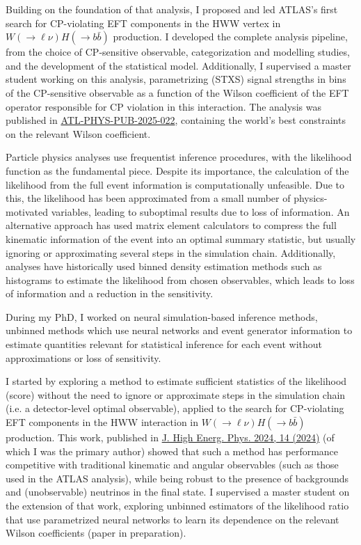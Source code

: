 \documentclass[11pt, a4paper]{awesome-cv}
\begin{document}
\begin{cvletter}
  Building on the foundation of that analysis, I proposed and led ATLAS's first search for CP-violating EFT components in the HWW vertex in $W(\to \ell \nu)H(\to b\bar{b})$ production. I developed the complete analysis pipeline, from the choice of CP-sensitive observable, categorization and modelling studies, and the development of the statistical model. Additionally, I supervised a master student working on this analysis, parametrizing (STXS) signal strengths in bins of the CP-sensitive observable as a function of the Wilson coefficient of the EFT operator responsible for CP violation in this interaction. The analysis was published in \href{https://atlas.web.cern.ch/Atlas/GROUPS/PHYSICS/PUBNOTES/ATL-PHYS-PUB-2025-022/}{ATL-PHYS-PUB-2025-022}, containing the world's best constraints on the relevant Wilson coefficient.
  
  
  Particle physics analyses use frequentist inference procedures, with the likelihood function as the fundamental piece. Despite its importance, the calculation of the likelihood from the full event information is computationally unfeasible. Due to this, the likelihood has been approximated from a small number of physics-motivated variables, leading to suboptimal results due to loss of information. An alternative approach has used matrix element calculators to compress the full kinematic information of the event into an optimal summary statistic, but usually ignoring or approximating several steps in the simulation chain. Additionally, analyses have historically used binned density estimation methods such as histograms to estimate the likelihood from chosen observables, which leads to loss of information and a reduction in the sensitivity.

  During my PhD, I worked on neural simulation-based inference methods, unbinned methods which use neural networks and event generator information to estimate quantities relevant for statistical inference for each event without approximations or loss of sensitivity.
  
  I started by exploring a method to estimate sufficient statistics of the likelihood (score) without the need to ignore or approximate steps in the simulation chain (i.e. a detector-level optimal observable), applied to the search for CP-violating EFT components in the HWW interaction in $W(\to \ell \nu)H(\to b\bar{b})$ production. This work, published in \href{https://doi.org/10.1007/JHEP04(2024)014}{J. High Energ. Phys. 2024, 14 (2024)} (of which I was the primary author) showed that such a method has performance competitive with traditional kinematic and angular observables (such as those used in the ATLAS analysis), while being robust to the presence of backgrounds and (unobservable) neutrinos in the final state. I supervised a master student on the extension of that work, exploring unbinned estimators of the likelihood ratio that use parametrized neural networks to learn its dependence on the relevant Wilson coefficients (paper in preparation).
  

\end{cvletter}
\end{document}
